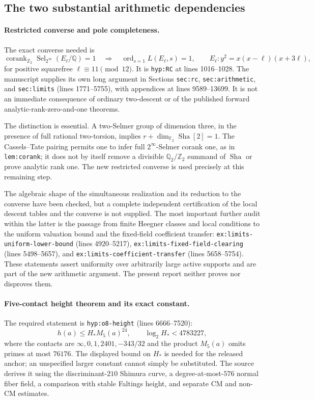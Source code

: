 \documentclass[11pt]{article}
\theoremstyle{definition}
\DeclareMathOperator{\Sha}{Sha}
\begin{document}
\subsection{The two substantial arithmetic dependencies}

\paragraph{Restricted converse and pole completeness.}
The exact converse needed is
\[
 \operatorname{corank}_{\mathbb Z_2}
  \operatorname{Sel}_{2^\infty}(E_\ell/\mathbb Q)=1
 \quad\Longrightarrow\quad
 \operatorname{ord}_{s=1}L(E_\ell,s)=1,
 \qquad E_\ell:y^2=x(x-\ell)(x+3\ell),
\]
for positive squarefree $\ell\equiv11\pmod{12}$.
It is \texttt{hyp:RC} at lines 1016--1028.  The manuscript supplies
its own long argument in Sections \texttt{sec:rc},
\texttt{sec:arithmetic}, and \texttt{sec:limits} (lines 1771--5755),
with appendices at lines 9589--13699.  It is not an immediate
consequence of ordinary two-descent or of the published forward
analytic-rank-zero-and-one theorems.

The distinction is essential.  A two-Selmer group of dimension three,
in the presence of full rational two-torsion, implies
$r+\dim_{\mathbb F_2}\Sha[2]=1$.  The Cassels--Tate pairing permits
one to infer full $2^\infty$-Selmer corank one, as in
\texttt{lem:corank}; it does not by itself remove a divisible
$\mathbb Q_2/\mathbb Z_2$ summand of $\Sha$ or prove analytic rank one.
The new restricted converse is used precisely at this remaining step.

The algebraic shape of the simultaneous realization and its reduction
to the converse have been checked, but a complete independent
certification of the local descent tables and the converse is not supplied.  The most important further audit
within the latter is the passage from finite Heegner classes and local
conditions to the uniform valuation bound and the fixed-field
coefficient transfer:
\nolinkurl{ex:limits-uniform-lower-bound} (lines 4920--5217),
\nolinkurl{ex:limits-fixed-field-clearing} (lines 5498--5657), and
\nolinkurl{ex:limits-coefficient-transfer} (lines 5658--5754).
These statements assert uniformity over arbitrarily large active
supports and are part of the new arithmetic argument.  The present
report neither proves nor disproves them.

\paragraph{Five-contact height theorem and its exact constant.}
The required statement is \texttt{hyp:o8-height}
(lines 6666--7520):
\[
 h(a)\le H_*M_5(a)^{24},\qquad \log_2H_*<4783227,
\]
where the contacts are $\infty,0,1,2401,-343/32$ and the product
$M_5(a)$ omits primes at most $76176$.
The displayed bound on $H_*$ is needed for the released anchor;
an unspecified larger constant cannot simply be substituted.
The source derives it using the discriminant-$210$ Shimura curve,
a degree-at-most-$576$ normal fiber field, a comparison with stable
Faltings height, and separate CM and non-CM estimates.
\end{document}
